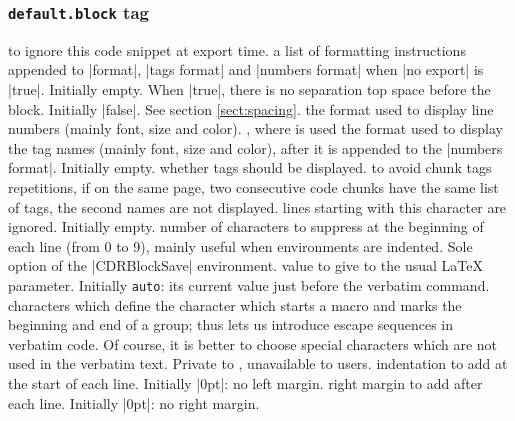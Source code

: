 \documentclass{article}
\def\CDRCheckRed {}
\def\CDRCheckProhibited {}
\begin{document}
\subsubsection{\texttt{default.block} tag}
\begin{description}
\itemtt[\CDRCheckRed no~export{[=true|false]}]
to ignore this code snippet at export time.
\itemtt[\CDRCheckRed no export format=\MyMeta{format commands}]
a list of formatting instructions appended to \CDRCode|format|, \CDRCode|tags format| and \CDRCode|numbers format|
when \CDRCode|no export| is \CDRCode|true|.
Initially empty.
\itemtt[\CDRCheckRed no top space{[=true|false]}]
When \CDRCode|true|, there is no separation top space before the block.
Initially \CDRCode|false|. See section \ref{sect:spacing}.
\itemtt[\CDRCheckRed numbers format=\CDRMeta{format commands}]
the format used to display line numbers (mainly font, size and color).
\itemtt[\CDRCheckRed tags format=\CDRMeta{format commands}]
, where  is used
the format used to display the tag names (mainly font, size and color),
after it is appended to the \CDRCode|numbers format|.
Initially empty.
\itemtt[\CDRCheckRed show tags={[=true|false]}]
whether tags should be displayed.
\itemtt[\CDRCheckRed only top{[=true|false]}]
to avoid chunk tags repetitions, if on the same page,
two consecutive code chunks have the same list of tags, the second names are not displayed.
\itemtt[\CDRCheckRed commentchar=\CDRMeta{character}]
lines starting with this character are ignored.
Initially empty.
\itemtt[\CDRCheckRed gobble=\CDRMeta{integer}]
number of characters to suppress
at the beginning of each line (from 0 to 9),
mainly useful when environments are indented.
Sole option of the \CDRCode|CDRBlockSave| environment.
\itemtt[\CDRCheckRed baselinestretch=auto|\CDRMeta{dimension}]
value to give to the usual  \LaTeX{} parameter.
Initially \texttt{auto}: its current value just before the verbatim command.
\itemtt[\CDRCheckProhibited commandchars=\CDRMeta{three characters}]
characters which define the character which starts a macro and marks the
beginning and end of a group; thus lets us introduce escape sequences in
verbatim code. Of course, it is better to choose special characters which
are not used in the verbatim text.
Private to , unavailable to users.
\itemtt[\CDRCheckRed xleftmargin=\CDRMeta{dimension}]
indentation to add at the start of each line.
Initially \CDRCode|0pt|: no left margin.
\itemtt[\CDRCheckRed xrightmargin=\CDRMeta{dimension}]
right margin to add after each line.
Initially \CDRCode|0pt|: no right margin.

\end{description}
\end{document}
